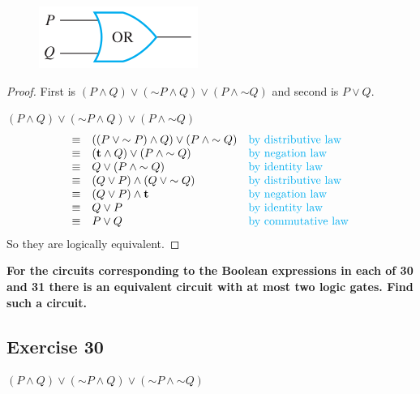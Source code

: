 \documentclass[14pt]{extarticle}
\newcommand{\true}{{\bf t}}
\begin{document}
\begin{figure}[ht!]
\centering
\includegraphics[scale=0.5]{../images/2.4.29.b.png}
\end{figure}

\begin{proof}
First is $(P \wedge Q) \vee ({\sim P} \wedge Q) \vee (P \wedge {\sim Q})$ and second is $P \vee Q$.

$(P \wedge Q) \vee ({\sim P} \wedge Q) \vee (P \wedge {\sim Q})$ $$
\begin{array}{cll}
\equiv & ((P \vee {\sim P}) \wedge Q) \vee (P \wedge {\sim
Q}) & \text{\color{cyan}by distributive law} \\
\equiv & (\true \wedge Q) \vee (P \wedge {\sim Q}) & \text{\color{cyan}by negation law} \\ \equiv & Q \vee (P
\wedge {\sim Q}) & \text{\color{cyan}by identity law} \\
\equiv & (Q \vee P) \wedge (Q \vee {\sim Q}) & \text{\color{cyan} by distributive law} \\
\equiv & (Q \vee P) \wedge \true & \text{\color{cyan}by negation law} \\
\equiv & Q \vee P & \text{\color{cyan}by identity law} \\
\equiv & P \vee Q & \text{\color{cyan}by commutative law} \\
\end{array}
$$
So they are logically equivalent.
\end{proof}

{\bf \color{cyan} For the circuits corresponding to the Boolean expressions in each of 30 and 31 there is an equivalent circuit with at most two logic gates. Find such a circuit.}

\subsection{Exercise 30}
$(P \wedge Q) \vee ({\sim P} \wedge Q) \vee ({\sim P} \wedge {\sim Q})$
\end{document}
